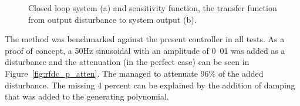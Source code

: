 \begin{figure}[h!]
  \centering %
  \qquad
  \caption{\label{fig:rfdc_s_gc} Closed loop system (a) and sensitivity function, the transfer function from output disturbance to system output (b).}
\end{figure}

\FloatBarrier
The \abbrIMP method was benchmarked against the present controller in all tests. As a proof of concept, a 50Hz sinusoidal with an amplitude of \unit{0.01}{\micro\radian} was added as a disturbance and the attenuation (in the perfect case) can be seen in Figure~\ref{fig:rfdc_p_atten}. The \abbrIMP managed to attenuate 96\% of the added disturbance. The missing 4 percent can be explained by the addition of damping that was added to the generating polynomial.

